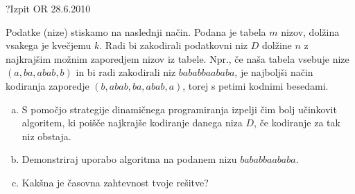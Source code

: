 \begin{naloga}{?}{Izpit OR 28.6.2010}
\begin{vprasanje}
Podatke (nize) stiskamo na naslednji način.
Podana je tabela $m$ nizov, dolžina vsakega je kvečjemu $k$.
Radi bi zakodirali podatkovni niz $D$ dolžine $n$
z najkrajšim možnim zaporedjem nizov iz tabele.
Npr., če naša tabela vsebuje nize $(a, ba, abab, b)$
in bi radi zakodirali niz $bababbaababa$,
je najboljši način kodiranja zaporedje $(b, abab, ba, abab, a)$,
torej s petimi kodnimi besedami.

\begin{enumerate}[(a)]
\item S pomočjo strategije dinamičnega programiranja
izpelji čim bolj učinkovit algoritem,
ki poišče najkrajše kodiranje danega niza $D$,
če kodiranje za tak niz obstaja.

\item Demonstriraj uporabo algoritma na podanem nizu $bababbaababa$.

\item Kakšna je časovna zahtevnost tvoje rešitve?
\end{enumerate}
\end{vprasanje}
\begin{odgovor}
\end{odgovor}
\end{naloga}

